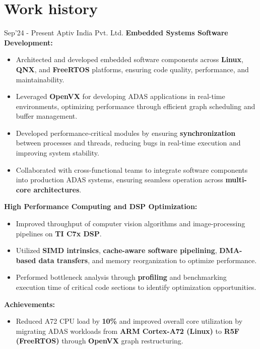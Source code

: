\documentclass[singlesided,
               paper=a4,
               fontsize=10pt
              ]{my-resume}
\begin{document}
{    \section{Work history}
        {Sep'24 - Present}
        {Aptiv India Pvt. Ltd.}
    \vspace{0.5em}
    \textbf{Embedded Systems Software Development:}
    \begin{itemize}
        \item Architected and developed embedded software components across \textbf{Linux}, \textbf{QNX}, and \textbf{FreeRTOS} platforms, ensuring code quality, performance, and maintainability.
        \item Leveraged \textbf{OpenVX} for developing ADAS applications in real-time environments, optimizing performance through efficient graph scheduling and buffer management.
        \item Developed performance-critical modules by ensuring \textbf{synchronization} between processes and threads, reducing bugs in real-time execution and improving system stability.
        \item Collaborated with cross-functional teams to integrate software components into production ADAS systems, ensuring seamless operation across \textbf{multi-core architectures}.
    \end{itemize}
    \vspace{0.5em}
    \textbf{High Performance Computing and DSP Optimization:}
    \begin{itemize}
        \item Improved throughput of computer vision algorithms and image-processing pipelines on \textbf{TI C7x DSP}.
        \item Utilized \textbf{SIMD intrinsics}, \textbf{cache-aware software pipelining}, \textbf{DMA-based data transfers}, and memory reorganization to optimize performance.
        \item Performed bottleneck analysis through \textbf{profiling} and benchmarking execution time of critical code sections to identify optimization opportunities.
    \end{itemize}
    \vspace{0.5em}
    \textbf{Achievements:}
    \begin{itemize}
        \item Reduced A72 CPU load by \textbf{10\%} and improved overall core utilization by migrating ADAS workloads from \textbf{ARM Cortex-A72 (Linux)} to \textbf{R5F (FreeRTOS)} through \textbf{OpenVX} graph restructuring.
    \end{itemize}
    }
\makebody
\clearpage
    
\end{document}
